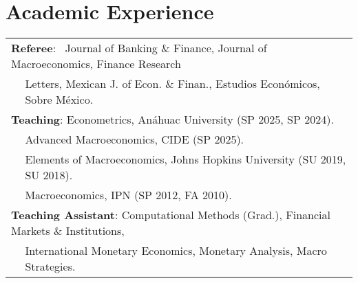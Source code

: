 \documentclass[12pt]{article}
\newcommand{\vsect}{\vspace{0.08cm}}
\begin{document}
	
	\section{Academic Experience} 
	\vsect
	\begin{tabular}{l m{15.3cm}}
		\multicolumn{2}{l}{\textbf{Referee}:  \, Journal of Banking \& Finance, Journal of Macroeconomics, Finance Research } \\
		& \vspace{-0.1cm} Letters, Mexican J. of Econ. \& Finan., Estudios Económicos, Sobre México. \\
		\multicolumn{2}{l}{\textbf{Teaching}: Econometrics, Anáhuac University (SP 2025, SP 2024).} \\ %
		& Advanced Macroeconomics, CIDE (SP 2025). \\ %
		 & Elements of Macroeconomics, Johns Hopkins University (SU 2019, SU 2018). \\
		\qquad \qquad \, & Macroeconomics, IPN (SP 2012, FA 2010). \\ %
		\multicolumn{2}{l}{\textbf{Teaching Assistant}: Computational Methods (Grad.), Financial Markets \& Institutions,} \\
		& \multirow{1}{14cm}{International Monetary Economics, Monetary Analysis, Macro Strategies.} \\ %
		
		
	\end{tabular}
	
\end{document}
